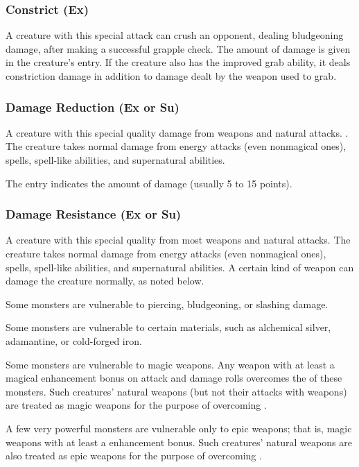 {\subsubsection{Constrict (Ex)} A creature with this special attack can crush an opponent, dealing bludgeoning damage, after making a successful grapple check. The amount of damage is given in the creature's entry. If the creature also has the improved grab ability, it deals constriction damage in addition to damage dealt by the weapon used to grab.

\subsubsection{Damage Reduction (Ex or Su)} A creature with this special quality  damage from weapons and natural attacks. . The creature takes normal damage from energy attacks (even nonmagical ones), spells, spell-like abilities, and supernatural abilities.

The entry indicates the amount of damage  (usually 5 to 15 points).


\subsubsection{Damage Resistance (Ex or Su)} A creature with this special quality  from most weapons and natural attacks. The creature takes normal damage from energy attacks (even nonmagical ones), spells, spell-like abilities, and supernatural abilities. A certain kind of weapon can  damage the creature normally, as noted below.

Some monsters are vulnerable to piercing, bludgeoning, or slashing damage.

Some monsters are vulnerable to certain materials, such as alchemical silver, adamantine, or cold-forged iron.

Some monsters are vulnerable to magic weapons. Any weapon with at least a  magical enhancement bonus on attack and damage rolls overcomes the  of these monsters. Such creatures' natural weapons (but not their attacks with weapons) are treated as magic weapons for the purpose of overcoming .

A few very powerful monsters are vulnerable only to epic weapons; that is, magic weapons with at least a  enhancement bonus. Such creatures' natural weapons are also treated as epic weapons for the purpose of overcoming .

}
